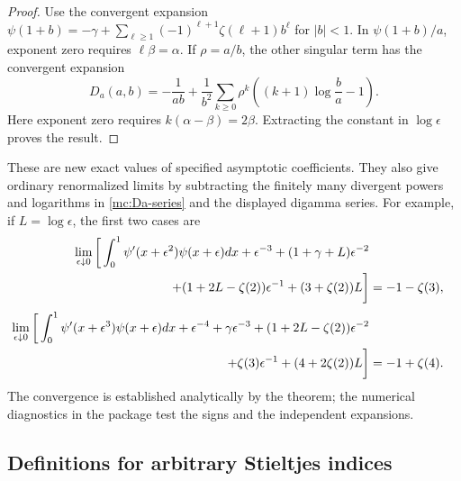 \documentclass[11pt,a4paper]{article}
\numberwithin{equation}{section}
\theoremstyle{definition}
\theoremstyle{remark}
\begin{document}
\begin{proof}
Use the convergent expansion
$\psi(1+b)=-\gamma+\sum_{\ell\ge1}(-1)^{\ell+1}
\zeta(\ell+1)b^\ell$ for $|b|<1$.
In $\psi(1+b)/a$, exponent zero requires $\ell\beta=\alpha$.
If $\rho=a/b$, the other singular term has the convergent expansion
\begin{equation}\label{mc:Da-series}
 D_a(a,b)=-\frac1{ab}
 +\frac1{b^2}\sum_{k\ge0}\rho^k
                   \left((k+1)\log\frac ba-1\right).
\end{equation}
Here exponent zero requires $k(\alpha-\beta)=2\beta$.
Extracting the constant in $\log\epsilon$ proves the result.
\end{proof}

These are new exact values of specified asymptotic coefficients.
They also give ordinary renormalized limits by subtracting the
finitely many divergent powers and logarithms in
\eqref{mc:Da-series} and the displayed digamma series. For example,
if $L=\log\epsilon$, the first two cases are
\begin{align}\label{mc:q2limit}
 \lim_{\epsilon\downarrow0}\bigg[
  \int_0^1\psi'(x+\epsilon^2)\psi(x+\epsilon)dx
   +\epsilon^{-3}+(1+\gamma+L)\epsilon^{-2}\notag\\
 \hspace{28mm}
   +(1+2L-\zeta(2))\epsilon^{-1}
   +(3+\zeta(2))L\bigg]
 &=-1-\zeta(3),\\[3pt]
 \lim_{\epsilon\downarrow0}\bigg[
  \int_0^1\psi'(x+\epsilon^3)\psi(x+\epsilon)dx
   +\epsilon^{-4}+\gamma\epsilon^{-3}
   +(1+2L-\zeta(2))\epsilon^{-2}\notag\\
 \hspace{28mm}
   +\zeta(3)\epsilon^{-1}
   +(4+2\zeta(2))L\bigg]
 &=-1+\zeta(4).
 \label{mc:q3limit}
\end{align}
The convergence is established analytically by the theorem;
the numerical diagnostics in the package test the signs and
the independent expansions.

\subsection{Definitions for arbitrary Stieltjes indices}
\end{document}
